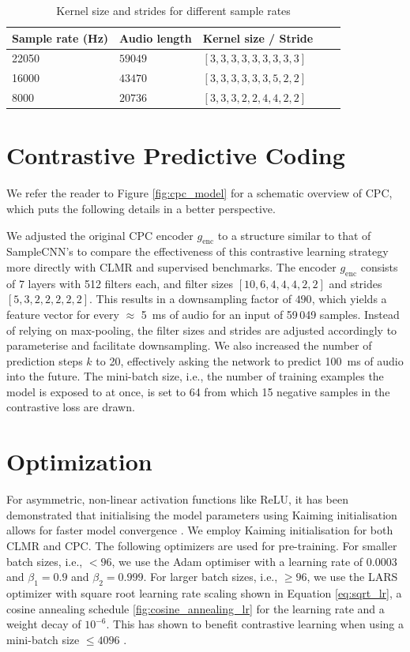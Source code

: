 \begin{table}
    \centering
        \begin{tabular}{lllll}\toprule
        Sample rate (Hz) & Audio length & Kernel size / Stride & \\\midrule
        22050 & $59049$  & $[3, 3, 3, 3, 3, 3, 3, 3, 3]$ \\
        16000 & $43470$ & $[3, 3, 3, 3, 3, 3, 5, 2, 2]$ \\
        8000 & $20736$ & $[3, 3, 3, 2, 2, 4, 4, 2, 2]$ \\                       
        \bottomrule
        \end{tabular}
    \caption{Kernel size and strides for different sample rates}
    \label{tab:samplecnn_config}
\end{table}

\section{Contrastive Predictive Coding}
We refer the reader to Figure \ref{fig:cpc_model} for a schematic overview of CPC, which puts the following details in a better perspective.

We adjusted the original CPC encoder $g_{\mathrm{enc}}$ to a structure similar to that of SampleCNN's to compare the effectiveness of this contrastive learning strategy more directly with CLMR and supervised benchmarks.
The encoder $g_{\mathrm{enc}}$ consists of 7 layers with 512 filters each, and filter sizes $[10, 6, 4, 4, 4, 2, 2]$ and strides $[5, 3, 2, 2, 2, 2, 2]$.
This results in a downsampling factor of $490$, which yields a feature vector for every $\approx$ 5~ms of audio for an input of 59\,049 samples.
Instead of relying on max-pooling, the filter sizes and strides are adjusted accordingly to parameterise and facilitate downsampling.
We also increased the number of prediction steps $k$ to 20, effectively asking the network to predict 100~ms of audio into the future.
The mini-batch size, i.e., the number of training examples the model is exposed to at once, is set to 64 from which 15 negative samples in the contrastive loss are drawn.

\section{Optimization}
For asymmetric, non-linear activation functions like ReLU, it has been demonstrated that initialising the model parameters using Kaiming initialisation allows for faster model convergence \cite{he2015delving}.
We employ Kaiming initialisation for both CLMR and CPC. The following optimizers are used for pre-training. For smaller batch sizes, i.e., $< 96$, we use the Adam optimiser with a learning rate of $0.0003$ and $\beta_1 = 0.9$ and $\beta_2 = 0.999$. 
For larger batch sizes, i.e., $\geq 96$, we use the LARS optimizer with  square root learning rate scaling shown in Equation \ref{eq:sqrt_lr}, a cosine annealing schedule \ref{fig:cosine_annealing_lr} for the learning rate and a weight decay of $10^{-6}$.
This has shown to benefit contrastive learning when using a mini-batch size $\leq 4096$ \cite{chen_simple_2020}.

